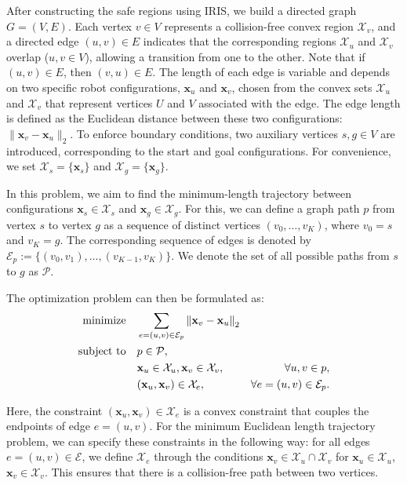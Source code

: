 After constructing the safe regions using IRIS, we build a directed graph \( G = (V, E) \). Each vertex \( v \in V \) represents a collision-free convex region \(\mathcal{X}_v\), and a directed edge \( (u, v) \in E \) indicates that the corresponding regions \(\mathcal{X}_u\) and \(\mathcal{X}_v\) overlap (\(u, v \in V\)), allowing a transition from one to the other. Note that if \( (u, v) \in E \), then \( (v, u) \in E \). The length of each edge is variable and depends on two specific robot configurations, \(\mathbf{x}_u\) and \(\mathbf{x}_v\), chosen from the convex sets \(\mathcal{X}_u\) and \(\mathcal{X}_v\) that represent vertices \(U\) and \(V\) associated with the edge. The edge length is defined as the Euclidean distance between these two configurations: \( \| \mathbf{x}_v - \mathbf{x}_u \|_2 \). To enforce boundary conditions, two auxiliary vertices \( s, g \in V \) are introduced, corresponding to the start and goal configurations. For convenience, we set \(\mathcal{X}_s = \{\mathbf{x}_s\}\) and \(\mathcal{X}_g = \{\mathbf{x}_g\}\).

In this problem, we aim to find the minimum-length trajectory between configurations \(\mathbf{x}_s \in \mathcal{X}_s\) and \(\mathbf{x}_g \in \mathcal{X}_g\). For this, we can define a graph path \(p\) from vertex \(s\) to vertex \(g\) as a sequence of distinct vertices \((v_0, \ldots, v_K)\), where \(v_0 = s\) and \(v_K = g\). The corresponding sequence of edges is denoted by \(\mathcal{E}_p := \{ (v_0, v_1), \ldots, (v_{K-1}, v_K) \}\). We denote the set of all possible paths from \(s\) to \(g\) as \(\mathcal{P}\).

The optimization problem can then be formulated as:
\begin{equation}\label{eq:1}
\begin{aligned}
\text{minimize} \quad & \sum_{e = (u,v) \in \mathcal{E}_p} \left\| \mathbf{x}_v - \mathbf{x}_u \right\|_2 \\
\text{subject to} \quad 
& p \in \mathcal{P}, \\
& \mathbf{x}_u \in \mathcal{X}_u, \space \mathbf{x}_v \in \mathcal{X}_v,       & \forall u,v \in p, \\
& (\mathbf{x}_u, \mathbf{x}_v) \in \mathcal{X}_e, & \forall e = (u,v) \in \mathcal{E}_p.
\end{aligned}
\end{equation}

Here, the constraint \((\mathbf{x}_u, \mathbf{x}_v) \in \mathcal{X}_e\) is a convex constraint that couples the endpoints of edge \(e = (u, v)\). For the minimum Euclidean length trajectory problem, we can specify these constraints in the following way: for all edges $e = (u, v) \in \mathcal{E}$, we define $\mathcal{X}_e$ through the conditions \(\mathbf{x}_v \in \mathcal{X}_u \cap \mathcal{X}_v\) for \(\mathbf{x}_u \in \mathcal{X}_u\), \(\mathbf{x}_v \in \mathcal{X}_v\). This ensures that there is a collision-free path between two vertices.

